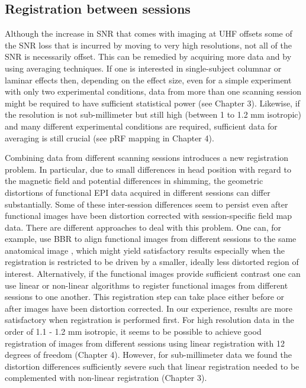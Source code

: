 \subsection{Registration between sessions}
Although the increase in SNR that comes with imaging at UHF offsets some of the SNR loss that is incurred by moving to very high resolutions, not all of the SNR is necessarily offset. This can be remedied by acquiring more data and by using averaging techniques. If one is interested in single-subject columnar or laminar effects then, depending on the effect size, even for a simple experiment with only two experimental conditions, data from more than one scanning session might be required to have sufficient statistical power (see Chapter 3). Likewise, if the resolution is not sub-millimeter but still high (between 1 to 1.2 mm isotropic) and many different experimental conditions are required, sufficient data for averaging is still crucial (see pRF mapping in Chapter 4).

Combining data from different scanning sessions introduces a new registration problem. In particular, due to small differences in head position with regard to the magnetic field and potential differences in shimming, the geometric distortions of functional EPI data acquired in different sessions can differ substantially. Some of these inter-session differences seem to persist even after functional images have been distortion corrected with session-specific field map data. There are different approaches to deal with this problem. One can, for example, use BBR to align functional images from different sessions to the same anatomical image \parencite{Nasr2016}, which might yield satisfactory results especially when the registration is restricted to be driven by a smaller, ideally less distorted region of interest. Alternatively, if the functional images provide sufficient contrast one can use linear \parencite{Jenkinson2001, Jenkinson2002} or non-linear algorithms \parencite{Andersson2007} to register functional images from different sessions to one another. This registration step can take place either before or after images have been distortion corrected. In our experience, results are more satisfactory when registration is performed first. For high resolution data in the order of 1.1 - 1.2 mm isotropic, it seems to be possible to achieve good registration of images from different sessions using linear registration with 12 degrees of freedom \parencite{Gulban2018b} (Chapter 4). However, for sub-millimeter data we found the distortion differences sufficiently severe such that linear registration needed to be complemented with non-linear registration \parencite{Schneider2019} (Chapter 3).

